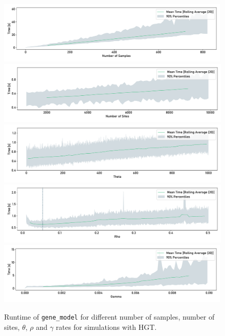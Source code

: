 \begin{figure}[H]
    \begin{flushright}
        \includegraphics[width=0.995\textwidth]{figures/runtime/hgt_num_samples.pdf}\\
        \includegraphics[width=\textwidth]{figures/runtime/hgt_num_sites.pdf}\\
        \includegraphics[width=\textwidth]{figures/runtime/hgt_theta.pdf}\\
        \includegraphics[width=\textwidth]{figures/runtime/hgt_rho.pdf}\\
        \includegraphics[width=0.995\textwidth]{figures/runtime/hgt_hgt_rate.pdf}
    \end{flushright}
    \centering
    \caption[Runtime with HGT.]{Runtime of \texttt{gene_model} for different number of samples, number of sites, $\theta$, $\rho$ and $\gamma$ rates
        for simulations with HGT.}
    \label{app:runtime-hgt}
\end{figure}
